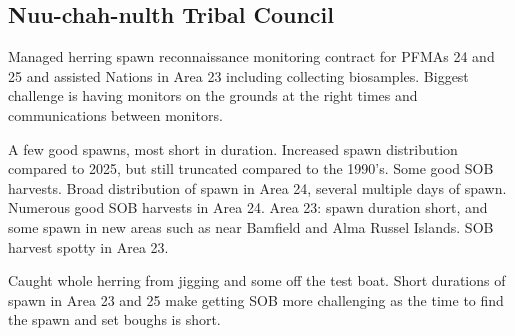 \subsection{Nuu-chah-nulth Tribal Council}

Managed herring spawn reconnaissance monitoring contract for PFMAs 24 and 25 and
assisted Nations in Area 23 including collecting biosamples.
Biggest challenge is having monitors on the grounds
at the right times and communications between monitors.

A few good spawns, most short in duration.
Increased spawn distribution compared to 2025,
but still truncated compared to the 1990's.
Some good SOB harvests.
Broad distribution of spawn in Area 24, several multiple days of spawn.
Numerous good SOB harvests in Area 24.
Area 23: spawn duration short,
and some spawn in new areas such as near Bamfield and Alma Russel Islands.
SOB harvest spotty in Area 23.

Caught whole herring from jigging and some off the test boat.
Short durations of spawn in Area 23 and 25
make getting SOB more challenging
as the time to find the spawn and set boughs is short.